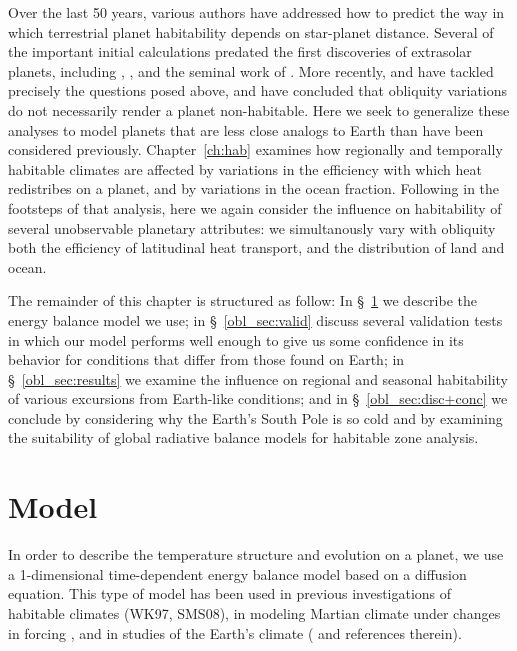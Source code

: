 Over the last 50 years, various authors have addressed how to predict
the way in which terrestrial planet habitability depends on
star-planet distance.  Several of the important initial calculations
predated the first discoveries of extrasolar planets, including
\citet{dole1964}, \citet{hart1979}, and the seminal work of
\citet{kasting_et_al1993}.  More recently, \citet[hereafter
WK97]{williams+kasting1997} and \citet{williams+pollard2003} have
tackled precisely the questions posed above, and have concluded that
obliquity variations do not necessarily render a planet non-habitable.
Here we seek to generalize these analyses to model planets that are
less close analogs to Earth than have been considered previously.
Chapter~\ref{ch:hab} \citep[hereafter SMS08]{spiegel_et_al2008}
examines how regionally and temporally habitable climates are affected
by variations in the efficiency with which heat redistribes on a
planet, and by variations in the ocean fraction.  Following in the
footsteps of that analysis, here we again consider the influence on
habitability of several unobservable planetary attributes: we
simultanously vary with obliquity both the efficiency of latitudinal
heat transport, and the distribution of land and ocean.

The remainder of this chapter is structured as follow: In
\S~\ref{obl_sec:model} we describe the energy balance model we use; in
\S~\ref{obl_sec:valid} discuss several validation tests in which our
model performs well enough to give us some confidence in its behavior
for conditions that differ from those found on Earth; in
\S~\ref{obl_sec:results} we examine the influence on regional and
seasonal habitability of various excursions from Earth-like
conditions; and in \S~\ref{obl_sec:disc+conc} we conclude by
considering why the Earth's South Pole is so cold and by examining the
suitability of global radiative balance models for habitable zone
analysis.


\section{Model}
\label{obl_sec:model}

In order to describe the temperature structure and evolution on a
planet, we use a 1-dimensional time-dependent energy balance model
based on a diffusion equation.  This type of model has been used in
previous investigations of habitable climates (WK97, SMS08), in
modeling Martian climate under changes in forcing
\citep{nakamura+tajika2002,nakamura+tajika2003}, and in studies of the
Earth's climate (\citealt{north_et_al1981} and references therein).

